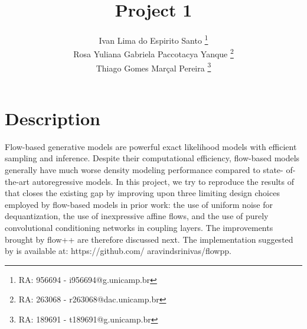 \documentclass[]{IEEEtran}
\begin{document}
\title{Project 1 }
\author{Ivan Lima do Espirito Santo \thanks{RA: 956694 - i956694@g.unicamp.br}\\ Rosa Yuliana Gabriela Paccotacya Yanque \thanks{RA: 263068 - r263068@dac.unicamp.br} \\ Thiago Gomes Marçal Pereira \thanks{RA: 189691 - t189691@g.unicamp.br}}

\maketitle
\section{Description}
Flow-based generative models are powerful exact likelihood models with efficient sampling and inference. Despite their computational efficiency, flow-based models generally have much worse density modeling performance compared to state- of-the-art autoregressive models. In this project, we try to reproduce the results of ~\cite{pmlr-v97-ho19a} that closes the existing gap by improving upon three limiting design choices employed by flow-based models in prior work: the use of uniform noise for dequantization, the use of inexpressive affine flows, and the use of purely convolutional conditioning networks in coupling layers. The improvements brought by flow++ are therefore discussed next. The implementation suggested by \cite{pmlr-v97-ho19a} is available at: https://github.com/ aravindsrinivas/flowpp. 
  
\end{document}
